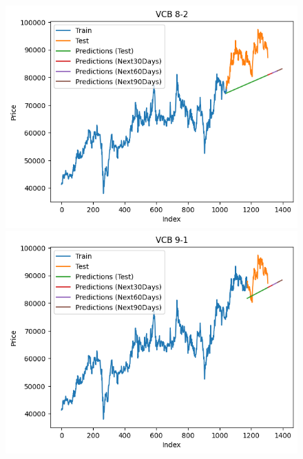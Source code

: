 \begin{figure}[H]
\begin{minipage}{0.15\textwidth}
    \centering
    \includegraphics[width=1\textwidth]{resources/chapter-5/newdata1/result/VCB_LinearRegression_8-2.png}
    \end{minipage}
    \hfill
        \begin{minipage}{0.15\textwidth}
    \centering
    \includegraphics[width=1\textwidth]{resources/chapter-5/newdata1/result/VCB_LinearRegression_9-1.png}
    \end{minipage}
    \hfill
    \begin{minipage}{0.15\textwidth}
    \centering

\end{minipage}
\end{figure}
